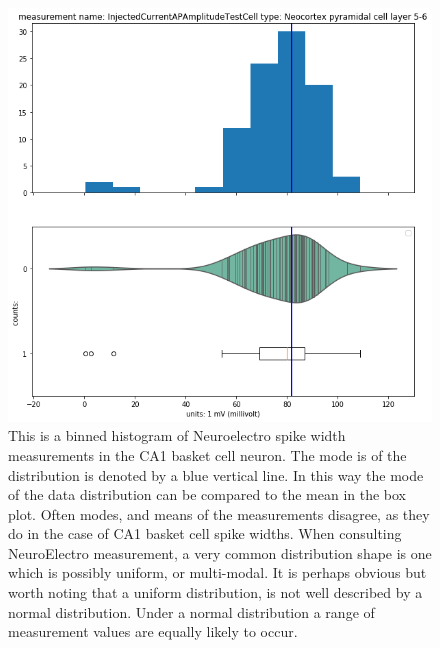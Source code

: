 \begin{figure}
\begin{center}
\includegraphics[width=0.7\linewidth]{chapters/notebooks_converted/needata_thesis_files/needata_thesis_5_16}
\caption{This is a binned histogram of Neuroelectro spike width measurements in the CA1 basket cell neuron.
The mode is of the distribution is denoted by a blue vertical line. In this way the mode of the data distribution can be compared to the mean in the box plot. Often modes, and means of the measurements disagree, as they do in the case of CA1 basket cell spike widths. When consulting NeuroElectro measurement, a very common distribution shape is one which is possibly uniform, or multi-modal. It is perhaps obvious but worth noting that a uniform distribution, is not well described by a normal distribution. Under a normal distribution a range of measurement values are equally likely to occur.}
\label{fig:uniform-feature}
\end{center}
\end{figure}

